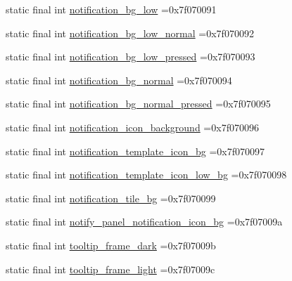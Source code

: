 \begin{DoxyCompactItemize}
\item 
static final int \mbox{\hyperlink{classbr_1_1unb_1_1cic_1_1mp_1_1marketmaster_1_1R_1_1drawable_abfa006f72a8671f16964cce2e3295a4e}{notification\+\_\+bg\+\_\+low}} =0x7f070091
\item 
static final int \mbox{\hyperlink{classbr_1_1unb_1_1cic_1_1mp_1_1marketmaster_1_1R_1_1drawable_a401db30fb3eb32ef96fb6f9ca42a2a27}{notification\+\_\+bg\+\_\+low\+\_\+normal}} =0x7f070092
\item 
static final int \mbox{\hyperlink{classbr_1_1unb_1_1cic_1_1mp_1_1marketmaster_1_1R_1_1drawable_a05c663ac6bd23eaa1bd3fc9d657732f8}{notification\+\_\+bg\+\_\+low\+\_\+pressed}} =0x7f070093
\item 
static final int \mbox{\hyperlink{classbr_1_1unb_1_1cic_1_1mp_1_1marketmaster_1_1R_1_1drawable_acc66e17a537f38e014932d369b76e575}{notification\+\_\+bg\+\_\+normal}} =0x7f070094
\item 
static final int \mbox{\hyperlink{classbr_1_1unb_1_1cic_1_1mp_1_1marketmaster_1_1R_1_1drawable_a288cb9360c9eeedeb2ebc5a8f1345d7a}{notification\+\_\+bg\+\_\+normal\+\_\+pressed}} =0x7f070095
\item 
static final int \mbox{\hyperlink{classbr_1_1unb_1_1cic_1_1mp_1_1marketmaster_1_1R_1_1drawable_a9864a2819017ede4b1fdc15bedd0b806}{notification\+\_\+icon\+\_\+background}} =0x7f070096
\item 
static final int \mbox{\hyperlink{classbr_1_1unb_1_1cic_1_1mp_1_1marketmaster_1_1R_1_1drawable_ae80ea831b6ec482e3fda0ae8434ad893}{notification\+\_\+template\+\_\+icon\+\_\+bg}} =0x7f070097
\item 
static final int \mbox{\hyperlink{classbr_1_1unb_1_1cic_1_1mp_1_1marketmaster_1_1R_1_1drawable_a990fcd54c68b3deda270e0d045044738}{notification\+\_\+template\+\_\+icon\+\_\+low\+\_\+bg}} =0x7f070098
\item 
static final int \mbox{\hyperlink{classbr_1_1unb_1_1cic_1_1mp_1_1marketmaster_1_1R_1_1drawable_a9c16107774af9bc1a20793b42594e9a2}{notification\+\_\+tile\+\_\+bg}} =0x7f070099
\item 
static final int \mbox{\hyperlink{classbr_1_1unb_1_1cic_1_1mp_1_1marketmaster_1_1R_1_1drawable_a58aae162e89048a49c3d2414ca87371c}{notify\+\_\+panel\+\_\+notification\+\_\+icon\+\_\+bg}} =0x7f07009a
\item 
static final int \mbox{\hyperlink{classbr_1_1unb_1_1cic_1_1mp_1_1marketmaster_1_1R_1_1drawable_ac4146d0831f5acadeb33d9110fda75e5}{tooltip\+\_\+frame\+\_\+dark}} =0x7f07009b
\item 
static final int \mbox{\hyperlink{classbr_1_1unb_1_1cic_1_1mp_1_1marketmaster_1_1R_1_1drawable_a44cb8d33e071153577cc8e28f4e4abcf}{tooltip\+\_\+frame\+\_\+light}} =0x7f07009c
\end{DoxyCompactItemize}


